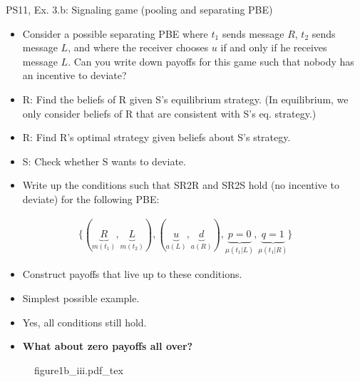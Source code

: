 \begin{frame}{PS11, Ex. 3.b: Signaling game (pooling and separating PBE)}
    \begin{itemize}
        \item[(b)] Consider a possible separating PBE where $t_1$ sends message $R$, $t_2$ sends message $L$, and where the receiver chooses $u$ if and only if he receives message $L$. Can you write down payoffs for this game such that nobody has an incentive to deviate?
    \end{itemize} \vspace{-8pt}
    \begin{multicols}{2}
      \begin{itemize}
        \item[SR3:] R: Find the beliefs of R given S's equilibrium strategy. (In equilibrium, we only consider beliefs of R that are consistent with S's eq. strategy.)
        \item[SR2R:] R: Find R's optimal strategy given beliefs about S's strategy.
        \item[SR2S:] S: Check whether S wants to deviate.
        \item[PBE:]  Write up the conditions such that SR2R and SR2S hold (no incentive to deviate) for the following PBE:
      \end{itemize}\vspace{-14pt}
      \begin{align*}
        \{(\underbrace{R}_{m(t_1)},\underbrace{L}_{m(t_2)}),(\underbrace{u}_{a(L)},\underbrace{d}_{a(R)}),\underbrace{p=0}_{\mu(t_1|L)},\underbrace{q=1}_{\mu(t_1|R)}\}
      \end{align*}\vspace{-12pt}
      \begin{itemize}
        \item[$\rightarrow$] Construct payoffs that live up to these conditions.
        \item[i:] Simplest possible example.
        \item[ii:] Yes, all conditions still hold.
        \item[iii:] \textbf{What about zero payoffs all over?}
      \end{itemize}
      \vfill\null\columnbreak
      \begin{figure}[!h]
        \center
        \def\svgwidth{1.1\columnwidth}
        {figure1b_iii.pdf_tex}
      \end{figure} \vspace{-8pt}

\end{multicols}
\end{frame}
